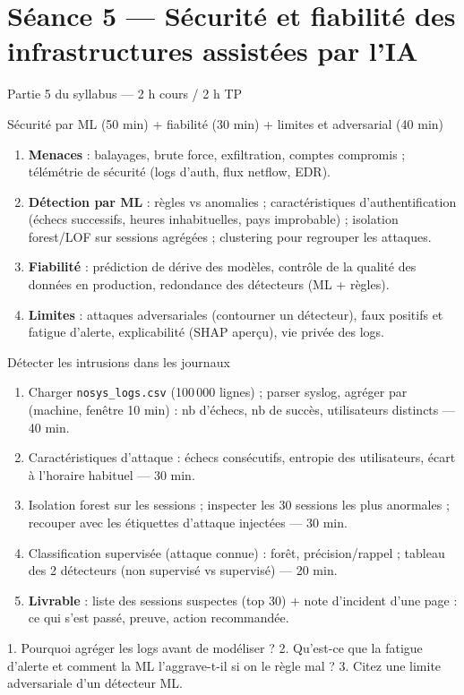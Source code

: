 \documentclass[11pt,a4paper]{article}
\begin{document}
\section*{Séance 5 — Sécurité et fiabilité des infrastructures assistées par l'IA}
\begin{seancebox}{Partie 5 du syllabus — 2 h cours / 2 h TP}
\end{seancebox}
\begin{coursbox}{Sécurité par ML (50 min) + fiabilité (30 min) + limites et adversarial (40 min)}
\begin{enumerate}[nosep]
\item \textbf{Menaces} : balayages, brute force, exfiltration, comptes compromis ; télémétrie de sécurité (logs d'auth, flux netflow, EDR).
\item \textbf{Détection par ML} : règles vs anomalies ; caractéristiques d'authentification (échecs successifs, heures inhabituelles, pays improbable) ; isolation forest/LOF sur sessions agrégées ; clustering pour regrouper les attaques.
\item \textbf{Fiabilité} : prédiction de dérive des modèles, contrôle de la qualité des données en production, redondance des détecteurs (ML + règles).
\item \textbf{Limites} : attaques adversariales (contourner un détecteur), faux positifs et fatigue d'alerte, explicabilité (SHAP aperçu), vie privée des logs.
\end{enumerate}
\end{coursbox}
\begin{tpbox}{Détecter les intrusions dans les journaux}
\begin{enumerate}[nosep]
\item Charger \texttt{nosys\_logs.csv} (100\,000 lignes) ; parser syslog, agréger par (machine, fenêtre 10 min) : nb d'échecs, nb de succès, utilisateurs distincts — 40 min.
\item Caractéristiques d'attaque : échecs consécutifs, entropie des utilisateurs, écart à l'horaire habituel — 30 min.
\item Isolation forest sur les sessions ; inspecter les 30 sessions les plus anormales ; recouper avec les étiquettes d'attaque injectées — 30 min.
\item Classification supervisée (attaque connue) : forêt, précision/rappel ; tableau des 2 détecteurs (non supervisé vs supervisé) — 20 min.
\item \textbf{Livrable} : liste des sessions suspectes (top 30) + note d'incident d'une page : ce qui s'est passé, preuve, action recommandée.
\end{enumerate}
\end{tpbox}
\begin{evalbox}
1. Pourquoi agréger les logs avant de modéliser ? 2. Qu'est-ce que la fatigue d'alerte et comment la ML l'aggrave-t-il si on le règle mal ? 3. Citez une limite adversariale d'un détecteur ML.
\end{evalbox}
\end{document}
